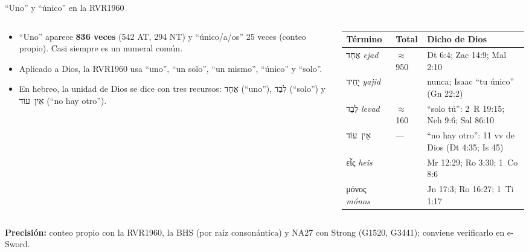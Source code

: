 \documentclass[hyperref={bookmarks=false},aspectratio=169]{beamer}
\newcommand{\heb}[1]{\mbox{\foreignlanguage{hebrew}{#1}}}
\newcommand{\grc}[1]{\foreignlanguage{ancientgreek}{#1}}
\newcommand{\destacar}[1]{\textbf{\textcolor{azul}{#1}}}
\newcommand{\precision}[1]{{\footnotesize\color{gris}\textbf{Precisión:} #1}}
\begin{document}
\begin{frame}{``Uno'' y ``único'' en la RVR1960}
\begin{columns}[c,onlytextwidth]
\begin{column}{0.46\textwidth}\footnotesize
\begin{itemize}
\item ``Uno'' aparece \destacar{836 veces} (542 AT, 294 NT) y ``único/a/os'' 25 veces (conteo propio). Casi siempre es un numeral común.
\item Aplicado a Dios, la RVR1960 usa ``uno'', ``un solo'', ``un mismo'', ``único'' y ``solo''.
\item En hebreo, la unidad de Dios se dice con tres recursos: \heb{אֶחָד} (``uno''), \heb{לְבַד} (``solo'') y \heb{אֵין עוֹד} (``no hay otro'').
\end{itemize}
\end{column}
\begin{column}{0.52\textwidth}
\scriptsize\renewcommand{\arraystretch}{1.12}
\begin{tabular}{@{}>{\RaggedRight\arraybackslash}p{2.2cm}>{\centering\arraybackslash}p{0.8cm}>{\RaggedRight\arraybackslash}p{3.3cm}@{}}
\toprule
\textbf{Término} & \textbf{Total} & \textbf{Dicho de Dios} \\ \midrule
\heb{אֶחָד} \emph{ejad} & $\approx$950 & Dt 6:4; Zac 14:9; Mal 2:10 \\
\heb{יָחִיד} \emph{yajid} & 12 & nunca; Isaac ``tu único'' (Gn 22:2) \\
\heb{לְבַד} \emph{levad} & $\approx$160 & ``solo tú'': 2~R 19:15; Neh 9:6; Sal 86:10 \\
\heb{אֵין עוֹד} & --- & ``no hay otro'': 11 vv de Dios (Dt 4:35; Is 45) \\
\grc{εἷς} \emph{heîs} & 339 & Mr 12:29; Ro 3:30; 1~Co 8:6 \\
\grc{μόνος} \emph{mónos} & 48 & Jn 17:3; Ro 16:27; 1~Ti 1:17 \\
\bottomrule
\end{tabular}
\end{column}
\end{columns}\par\smallskip
\precision{conteo propio con la RVR1960, la BHS (por raíz consonántica) y NA27 con Strong (G1520, G3441); conviene verificarlo en e-Sword.}
\end{frame}
\end{document}
